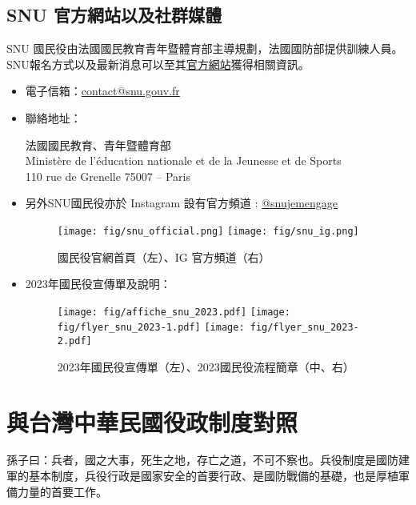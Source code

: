 \documentclass[a4paper,14pt]{extarticle}
\theoremstyle{plain}
\theoremstyle{remark}
\numberwithin{equation}{section}
\begin{document}
\subsection{SNU 官方網站以及社群媒體}
SNU 國民役由法國國民教育青年暨體育部主導規劃，法國國防部提供訓練人員。SNU報名方式以及最新消息可以至其\href{www.snu.gouv.fr}{官方網站}獲得相關資訊。
\begin{itemize}
  \item 
電子信箱：\url{contact@snu.gouv.fr}
\item 
聯絡地址： 
\begin{center}
法國國民教育、青年暨體育部
\\ Ministère de l’éducation nationale et de la Jeunesse et de Sports
\\  110 rue de Grenelle 75007 – Paris
\end{center}
\item 
另外SNU國民役亦於 Instagram 設有官方頻道  : \href{https://www.instagram.com/snujemengage/?hl=fr}{@snujemengage}
\begin{figure}[H]
  \begin{center}
    \texttt{[image: fig/snu\_official.png]}
    \texttt{[image: fig/snu\_ig.png]}
  \end{center}
  \caption{國民役官網首頁（左）、IG 官方頻道（右）}
\end{figure}

\item 2023年國民役宣傳單及說明：
\begin{figure}[H]
  \begin{center}
    \texttt{[image: fig/affiche\_snu\_2023.pdf]}
    \texttt{[image: fig/flyer\_snu\_2023-1.pdf]}
    \texttt{[image: fig/flyer\_snu\_2023-2.pdf]}
  \end{center}
  \caption{2023年國民役宣傳單（左）、2023國民役流程簡章（中、右）}
\end{figure}
\end{itemize}


\newpage


\section{與台灣中華民國役政制度對照}


孫子曰：兵者，國之大事，死生之地，存亡之道，不可不察也。兵役制度是國防建軍的基本制度，兵役行政是國家安全的首要行政、是國防戰備的基礎，也是厚植軍備力量的首要工作。
\end{document}
